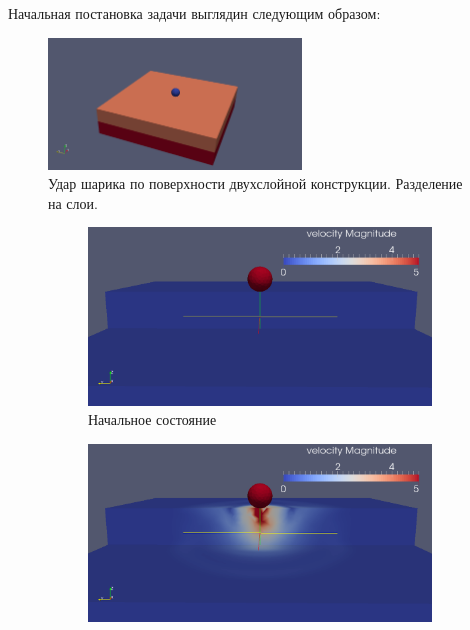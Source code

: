 	Начальная постановка задачи выглядин следующим образом:
\begin{figure}[H]
\centerline{\includegraphics[width=0.6\textwidth]{png/delamination/mat_view.png}}
\caption{Удар шарика по поверхности двухслойной конструкции. Разделение на слои.}
\label{pic:delamination_view}
\end{figure}

\begin{figure}[H]
\begin{subfigure}[b]{0.5\textwidth}
\centering
\includegraphics[width=1.0\textwidth]{png/delamination/velocity/0.png}
\caption{Начальное состояние}
\end{subfigure}
\begin{subfigure}[b]{0.5\textwidth}
\centering
\includegraphics[width=1.0\textwidth]{png/delamination/velocity/50.png}

\end{subfigure}
\end{figure}
